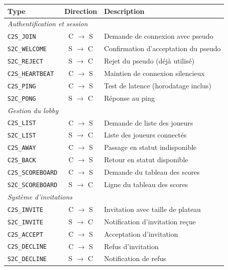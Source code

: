 \documentclass[a4paper]{article}
\begin{document}
\begin{table}[H]
    \centering
    \renewcommand{\arraystretch}{1.3}
    \begin{tabularx}{\textwidth}{|l|c|X|}
        \hline
        \textbf{Type} & \textbf{Direction} & \textbf{Description} \\
        \hline
        \multicolumn{3}{|l|}{\textit{Authentification et session}} \\
        \hline
        \texttt{C2S\_JOIN} & C $\to$ S & Demande de connexion avec pseudo \\
        \texttt{S2C\_WELCOME} & S $\to$ C & Confirmation d'acceptation du pseudo \\
        \texttt{S2C\_REJECT} & S $\to$ C & Rejet du pseudo (déjà utilisé) \\
        \texttt{C2S\_HEARTBEAT} & C $\to$ S & Maintien de connexion silencieux \\
        \texttt{C2S\_PING} & C $\to$ S & Test de latence (horodatage inclus) \\
        \texttt{S2C\_PONG} & S $\to$ C & Réponse au ping \\
        \hline
        \multicolumn{3}{|l|}{\textit{Gestion du lobby}} \\
        \hline
        \texttt{C2S\_LIST} & C $\to$ S & Demande de liste des joueurs \\
        \texttt{S2C\_LIST} & S $\to$ C & Liste des joueurs connectés \\
        \texttt{C2S\_AWAY} & C $\to$ S & Passage en statut indisponible \\
        \texttt{C2S\_BACK} & C $\to$ S & Retour en statut disponible \\
        \texttt{C2S\_SCOREBOARD} & C $\to$ S & Demande du tableau des scores \\
        \texttt{S2C\_SCOREBOARD} & S $\to$ C & Ligne du tableau des scores \\
        \hline
        \multicolumn{3}{|l|}{\textit{Système d'invitations}} \\
        \hline
        \texttt{C2S\_INVITE} & C $\to$ S & Invitation avec taille de plateau \\
        \texttt{S2C\_INVITE} & S $\to$ C & Notification d'invitation reçue \\
        \texttt{C2S\_ACCEPT} & C $\to$ S & Acceptation d'invitation \\
        \texttt{C2S\_DECLINE} & C $\to$ S & Refus d'invitation \\
        \texttt{S2C\_DECLINE} & S $\to$ C & Notification de refus \\

\end{tabularx}
\end{table}
\end{document}
